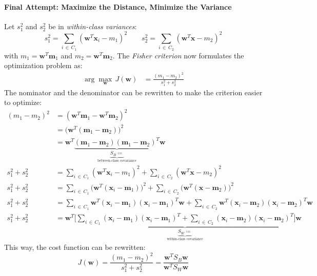 \documentclass[a4paper, 11pt, accentcolor = tud3b]{tudreport}
\renewcommand{\vec}[1]{\mathbf{#1}}
\begin{document}
				\paragraph{Final Attempt: Maximize the Distance, Minimize the Variance}
					Let \( s_1^2 \) and \( s_2^2 \) be in \emph{within-class variances}:
					\begin{equation}
						s_1^2 = \sum_{i \,\in\, C_1} (\vec{w}^T \vec{x}_i - m_1)^2 \qquad s_2^2 = \sum_{i \,\in\, C_2} (\vec{w}^T \vec{x} - m_2)^2
					\end{equation}
					with \( m_1 = \vec{w}^T \vec{m}_1 \) and \( m_2 = \vec{w}^T \vec{m}_2 \). The \emph{Fisher criterion} now formulates the optimization problem as:
					\begin{align}
						\arg\max\limits_{\vec{w}} \, J(\vec{w}) &= \frac{(m_1 - m_2)^2}{s_1^2 + s_2^2}
					\end{align}
					The nominator and the denominator can be rewritten to make the criterion easier to optimize:
					\begin{align}
						(m_1 - m_2)^2 &= (\vec{w}^T \vec{m}_1 - \vec{w}^T \vec{m}_2)^2 \\
							&= \big(\vec{w}^T (\vec{m}_1 - \vec{m}_2)\big)^2 \\
							&= \vec{w}^T \underbrace{(\vec{m}_1 - \vec{m}_2) (\vec{m}_1 - \vec{m}_2)^T}_{\underbrace{S_B \coloneqq}_{\textrm{between-class covariance}}} \vec{w} \\
						s_1^2 + s_2^2 &= \sum_{i \,\in\, C_1} (\vec{w}^T \vec{x}_i - m_1)^2 + \sum_{i \,\in\, C_2} (\vec{w}^T \vec{x} - m_2)^2 \\
						s_1^2 + s_2^2 &= \sum_{i \,\in\, C_1} \big(\vec{w}^T (\vec{x}_i - \vec{m}_1)\big)^2 + \sum_{i \,\in\, C_2} \big(\vec{w}^T (\vec{x} - \vec{m}_2)\big)^2 \\
						s_1^2 + s_2^2 &= \sum_{i \,\in\, C_1} \vec{w}^T (\vec{x}_i - \vec{m}_1) (\vec{x}_i - \vec{m}_1)^T \vec{w} + \sum_{i \,\in\, C_2} \vec{w}^T (\vec{x}_i - \vec{m}_2) (\vec{x}_i - \vec{m}_2)^T \vec{w} \\
						s_1^2 + s_2^2 &= \vec{w}^T \underbrace{\Bigg[ \sum_{i \,\in\, C_1} (\vec{x}_i - \vec{m}_1) (\vec{x}_i - \vec{m}_1)^T + \sum_{i \,\in\, C_2} (\vec{x}_i - \vec{m}_2) (\vec{x}_i - \vec{m}_2)^T \Bigg]}_{\underbrace{S_W \coloneqq}_{\textrm{within-class covariance}}} \vec{w}
					\end{align}
					This way, the cost function can be rewritten:
					\begin{equation}
						J(\vec{w}) = \frac{(m_1 - m_2)^2}{s_1^2 + s_2^2} = \frac{\vec{w}^T S_B \vec{w}}{\vec{w}^T S_W \vec{w}}
					\end{equation}
\end{document}
